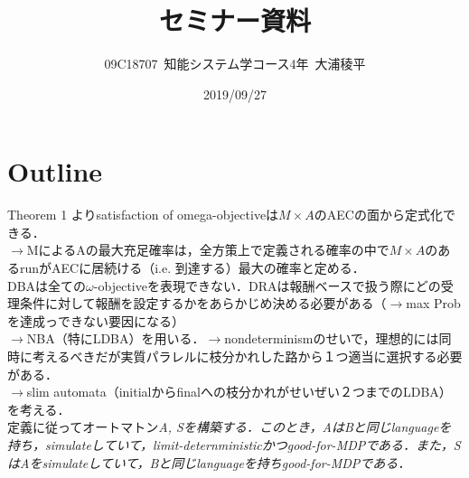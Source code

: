 \documentclass[10.5pt,a4j]{jsarticle}
\title{セミナー資料}
\author{09C18707\ 知能システム学コース4年\ 大浦稜平}
\date{2019/09/27}
\begin{document}
\maketitle

\section{Outline}

Theorem 1 よりsatisfaction of omega-objectiveは$M\times A$のAECの面から定式化できる．\\
$\rightarrow$MによるAの最大充足確率は，全方策上で定義される確率の中で$M\times A$のあるrunがAECに居続ける（i.e. 到達する）最大の確率と定める．\\

DBAは全ての$\omega$-objectiveを表現できない．DRAは報酬ベースで扱う際にどの受理条件に対して報酬を設定するかをあらかじめ決める必要がある（$\rightarrow$max Probを達成っできない要因になる）\\

$\rightarrow$NBA（特にLDBA）を用いる．$\rightarrow$nondeterminismのせいで，理想的には同時に考えるべきだが実質パラレルに枝分かれした路から１つ適当に選択する必要がある．\\

$\rightarrow$slim automata（initialからfinalへの枝分かれがせいぜい２つまでのLDBA）を考える．\\



定義に従ってオートマトン\it{A}, \it{S}を構築する．このとき，\it{A}は\it{B}と同じlanguageを持ち，simulateしていて，limit-deternministicかつgood-for-MDPである．また，\it{S}は\it{A}をsimulateしていて，\it{B}と同じlanguageを持ちgood-for-MDPである．
\end{document}
